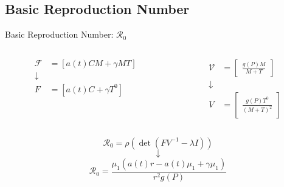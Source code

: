 \documentclass{beamer}
\begin{document}
\subsection{Basic Reproduction Number}
\begin{frame}{Basic Reproduction Number: $\mathscr{R}_{0}$}
    \begin{columns}
        \begin{column}{0.5\textwidth}
            \begin{align*}
                \mathscr{F} & = [a(t)CM + \gamma MT]\\
                \downarrow\\
                F & = [a(t)C+\gamma T^{0}]
            \end{align*}
        \end{column}
        \begin{column}{0.5\textwidth}
            \begin{align*}
                \mathscr{V} & = \begin{bmatrix} \frac{g(P)M}{M+T} \end{bmatrix}\\
                \downarrow\\
                V & = \begin{bmatrix} \frac{g(P)T^{0}}{(M + T)^{2}} \end{bmatrix}
            \end{align*}
        \end{column}
    \end{columns}
    \quad
    $$\mathscr{R}_{0} = \rho(\det(FV^{-1}-\lambda I))$$
    $$\downarrow$$
    $$\displaystyle {\mathscr{R}}_{0} = \frac{\mu_{1}(a(t)r - a(t)\mu_{1} + \gamma \mu_{1})}{r^{2}g(P)}$$
\end{frame}
\end{document}
